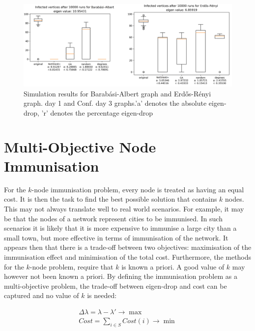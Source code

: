 \documentclass[11pt]{article}
\theoremstyle{definition}
\begin{document}
\begin{figure}[h!]
  \centering
    \includegraphics[width=1\textwidth]{sim_res_e/Barabasi_Erdos}
  \caption{Simulation results for Barab\'asi-Albert graph and Erd\H{o}s-R\'enyi graph. day 1 and Conf. day 3 graphs.'a' denotes the absolute eigen-drop, 'r' denotes the percentage eigen-drop}
  \label{fig:sim_barabasi_erdos}
\end{figure}



\cleardoublepage

\section{ Multi-Objective Node Immunisation }

For the $k$-node immunisation problem, every node is treated as having an equal cost. It is then the task to find the best possible solution that contains $k$ nodes. This may not always translate well to real world scenarios. For example, it may be that the nodes of a network represent cities to be immunised. In such scenarios it is likely that it is more expensive to immunise a large city than a small town, but more effective in terms of immunisation of the network. It appears then that there is a trade-off between two objectives: maximisation of the immunisation effect and minimisation of the total cost. Furthermore, the methods for the $k$-node problem, require that $k$ is known a priori. A good value of $k$ may however not been known a priori. By defining the immunisation problem as a multi-objective problem, the trade-off between eigen-drop and cost can be captured and no value of $k$ is needed:

\begin{equation}
\begin{gathered}
\Delta\lambda = \lambda - \lambda' \to \max \\
Cost = \sum_{i \in S} Cost(i) \to \min \\
\end{gathered}
\end{equation}
\end{document}

